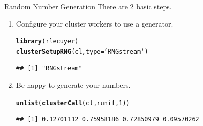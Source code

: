 \documentclass[aspectratio=169]{beamer}\usepackage[]{graphicx}\usepackage[]{color}
\makeatletter
\newcommand{\hlnum}[1]{\textcolor[rgb]{0.686,0.059,0.569}{#1}}%
\newcommand{\hlstr}[1]{\textcolor[rgb]{0.192,0.494,0.8}{#1}}%
\newcommand{\hlstd}[1]{\textcolor[rgb]{0.345,0.345,0.345}{#1}}%
\newcommand{\hlkwc}[1]{\textcolor[rgb]{0.333,0.667,0.333}{#1}}%
\newcommand{\hlkwd}[1]{\textcolor[rgb]{0.737,0.353,0.396}{\textbf{#1}}}%
\newenvironment{kframe}{%
 \def\at@end@of@kframe{}%
 \ifinner\ifhmode%
  \def\at@end@of@kframe{\end{minipage}}%
  \begin{minipage}{\columnwidth}%
 \fi\fi%
 \def\FrameCommand##1{\hskip\@totalleftmargin \hskip-\fboxsep
 \colorbox{shadecolor}{##1}\hskip-\fboxsep
     \hskip-\linewidth \hskip-\@totalleftmargin \hskip\columnwidth}%
 \MakeFramed {\advance\hsize-\width
   \@totalleftmargin\z@ \linewidth\hsize
   \@setminipage}}%
 {\par\unskip\endMakeFramed%
 \at@end@of@kframe}
\newenvironment{knitrout}{}{} %
\makeatother
\begin{document}
\begin{frame}[fragile]{Random Number Generation}
  There are 2 basic steps.\\
  \begin{enumerate}
    \item Configure your cluster workers to use a generator.
\begin{knitrout}\scriptsize
{}\color{fgcolor}\begin{kframe}
\begin{alltt}
\hlkwd{library}\hlstd{(rlecuyer)}
\hlkwd{clusterSetupRNG}\hlstd{(cl,} \hlkwc{type} \hlstd{=} \hlstr{'RNGstream'}\hlstd{)}
\end{alltt}
\begin{verbatim}
## [1] "RNGstream"
\end{verbatim}
\end{kframe}
\end{knitrout}

    \item Be happy to generate your numbers.
\begin{knitrout}\scriptsize
{}\color{fgcolor}\begin{kframe}
\begin{alltt}
\hlkwd{unlist}\hlstd{(}\hlkwd{clusterCall}\hlstd{(cl, runif,} \hlnum{1}\hlstd{))}
\end{alltt}
\begin{verbatim}
## [1] 0.12701112 0.75958186 0.72850979 0.09570262
\end{verbatim}
\end{kframe}
\end{knitrout}

  \end{enumerate}
\end{frame}
\end{document}
